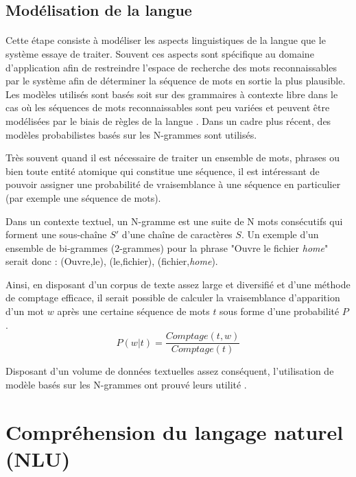 	\subsection{Modélisation de la langue}
		\paragraph{}
		Cette étape consiste à modéliser les aspects linguistiques de la langue que le système essaye de traiter. Souvent ces aspects sont spécifique au domaine d'application afin de restreindre l'espace de recherche des mots reconnaissables par le système afin de déterminer la séquence de mots en sortie la plus plausible. Les modèles utilisés sont basés soit sur des grammaires à contexte libre dans le cas où les séquences de mots reconnaissables sont peu variées et peuvent être modélisées par le biais de règles de la langue \cite{LM_grammar}. Dans un cadre plus récent, des modèles probabilistes basés sur les N-grammes sont utilisés. 
		\par
		\label{n-grams}
		Très souvent quand il est nécessaire de traiter un ensemble de mots, phrases ou bien toute entité atomique qui constitue une séquence, il est intéressant de pouvoir assigner une probabilité de vraisemblance à une séquence en particulier (par exemple une séquence de mots). 
		\par Dans un contexte textuel, un N-gramme est une suite de N mots consécutifs qui forment une sous-chaîne $S\prime$ d'une chaîne de caractères $S$. Un exemple d'un ensemble de bi-grammes (2-grammes) pour la phrase "Ouvre le fichier \textit{home}" serait donc : (Ouvre,le), (le,fichier), (fichier,\textit{home}).
		\par 
		Ainsi, en disposant d'un corpus de texte assez large et diversifié et d'une méthode de comptage efficace, il serait possible de calculer la vraisemblance d'apparition d'un mot $w$ après une certaine séquence de mots $t$ sous forme d'une probabilité $P$ \cite{nlp_ngrams}.
		\begin{equation}
		P(w|t) = \frac{Comptage(t,w)}{Comptage(t)}
		\end{equation}
		\par
		Disposant d'un volume de données textuelles assez conséquent, l'utilisation de modèle basés sur les N-grammes ont prouvé leurs utilité \cite{nlp_ngrams,speech_reco_Yu2015,LM_n-grams} .
		
		
\section{Compréhension du langage naturel (NLU)}
